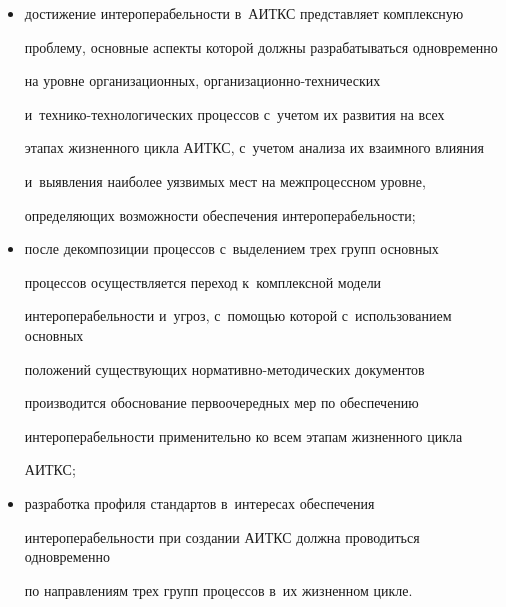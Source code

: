   \begin{itemize}

  \item достижение интероперабельности в~АИТКС представляет комплексную 

проб\-ле\-му, основные аспекты которой должны разрабатываться одновременно 

на уровне организационных, ор\-га\-ни\-за\-ци\-он\-но-тех\-ни\-че\-ских  

и~тех\-ни\-ко-тех\-но\-ло\-ги\-че\-ских процессов с~учетом их развития на всех 

этапах жизненного цикла АИТКС, с~учетом анализа их взаимного влияния 

и~выявления наиболее уязвимых мест на межпроцессном уровне, 

определяющих возможности обеспечения интероперабельности;

  \item после декомпозиции процессов с~выделением трех групп основных 

процессов осуществляется переход к~комплексной модели 

интероперабельности и~угроз, с~помощью которой с~использованием основных 

положений существующих нор\-ма\-тив\-но-ме\-то\-ди\-че\-ских документов 

производится обоснование первоочередных мер по обеспечению 

интероперабельности применительно ко всем этапам жизненного цикла 

АИТКС;

  \item разработка профиля стандартов в~интересах обеспечения 

ин\-тер\-опе\-ра\-бель\-ности при создании АИТКС должна проводиться одновременно 

по на\-прав\-ле\-ни\-ям трех групп процессов в~их жизненном цикле. 

  \end{itemize}

  

  \vspace*{-4pt}



